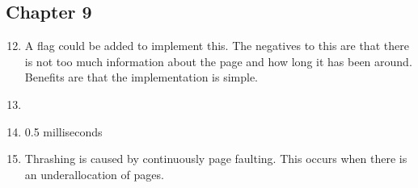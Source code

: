 \documentclass{article}
\begin{document}
\subsection*{Chapter 9}
\begin{enumerate}
\setcounter{enumi}{11}
\item A flag could be added to implement this. The negatives to this are that there is not too much information about the page and how long it has been around. Benefits are that the implementation is simple.
\item
\item 0.5 milliseconds
\item Thrashing is caused by continuously page faulting. This occurs when there is an underallocation of pages.
\end{enumerate}
\end{document}
